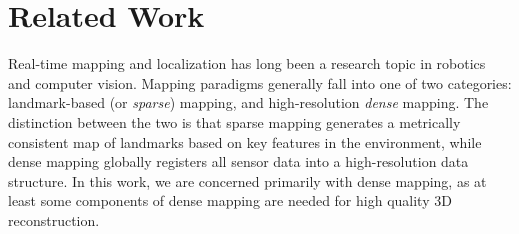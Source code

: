 \documentclass[conference,10pt]{IEEEtran}
\begin{document}
\section{Related Work}
Real-time mapping and localization has long been a research topic in robotics
and computer vision. Mapping paradigms generally fall into one of two
categories: landmark-based (or \emph{sparse}) mapping, and high-resolution
\emph{dense} mapping. The distinction between the two is that sparse mapping
generates a metrically consistent map of landmarks based on key features in the
environment, while dense mapping globally registers all sensor data into a
high-resolution data structure. In this work, we are concerned primarily with
dense mapping, as at least some components of dense mapping are needed for high
quality 3D reconstruction. 
\end{document}
